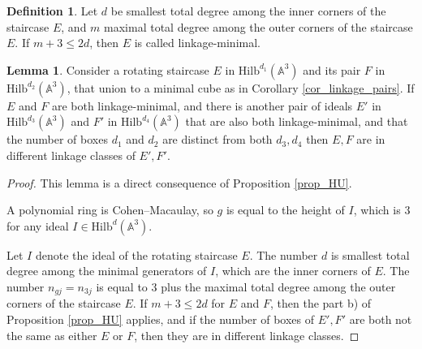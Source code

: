 \documentclass{amsart}[10pt]
\theoremstyle{plain}
\theoremstyle{definition}
\newtheorem{lemma}[theorem]{Lemma}
\newtheorem{definition}[theorem]{Definition}
\newcommand{\Hilb}{\mathrm{Hilb}}
\begin{document}
\begin{definition}
Let $d$ be smallest total degree among the inner corners of the staircase $E$, and $m$ maximal total degree among the outer corners of the staircase $E$. If $m+3 \leq 2d$, then $E$ is called linkage-minimal.
\end{definition}


\begin{lemma}
Consider a rotating staircase $E$ in $\Hilb^{d_1}(\mathbb{A}^3)$ and its pair $F$ in $\Hilb^{d_2}(\mathbb{A}^3)$, that union to a minimal cube as in Corollary \ref{cor_linkage_pairs}. If $E$ and $F$ are both linkage-minimal, and there is another pair of ideals $E'$ in $\Hilb^{d_3}(\mathbb{A}^3)$ and $F'$ in $\Hilb^{d_4}(\mathbb{A}^3)$ that are also both linkage-minimal, and that the number of boxes $d_1$ and $d_2$ are distinct from both $d_3, d_4$ then $E,F$ are in different linkage classes of $E',F'$.
\end{lemma}

\begin{proof}
This lemma is a direct consequence of Proposition \ref{prop_HU}.

A polynomial ring is Cohen–Macaulay, so $g$ is equal to the height of $I$, which is $3$ for any ideal $I \in \Hilb^d(\mathbb{A}^3)$. 

Let $I$ denote the ideal of the rotating staircase $E$. The number $d$ is smallest total degree among the minimal generators of $I$, which are the inner corners of $E$. The number $n_{gj}=n_{3j} $ is equal to $3$ plus the maximal total degree among the outer corners of the staircase $E$. If $m+3 \leq 2d$ for $E$ and $F$, then the part b) of Proposition \ref{prop_HU} applies, and if the number of boxes of $E',F'$ are both not the same as either $E$ or $F$, then they are in different linkage classes.
\end{proof}
\end{document}
